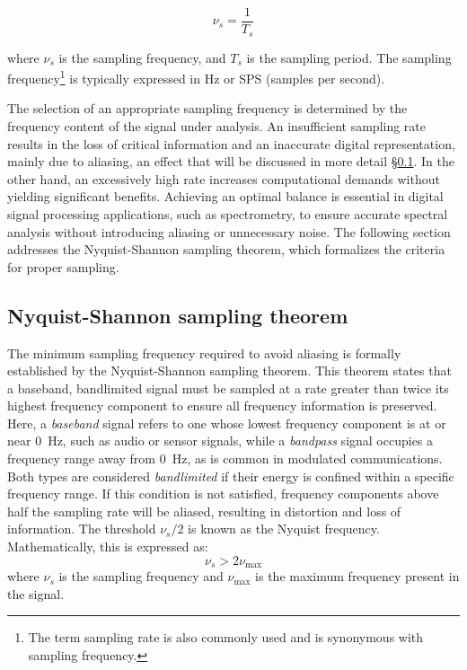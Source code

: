 \begin{equation}
	\nu_s = \frac{1}{T_s}
	\label{eq:sampling_frequency}
\end{equation}

where $\nu_s$ is the sampling frequency, and $T_s$ is the sampling period. The sampling frequency\footnote{The term sampling rate is also commonly used and is synonymous with sampling frequency.} is typically expressed in Hz or SPS (samples per second).


The selection of an appropriate sampling frequency is determined by the frequency content of the signal under analysis. An insufficient sampling rate results in the loss of critical information and an inaccurate digital representation, mainly due to aliasing, an effect that will be discussed in more detail \S \ref{sec:nyquist_shannon}. In the other hand, an excessively high rate increases computational demands without yielding significant benefits. Achieving an optimal balance is essential in digital signal processing applications, such as spectrometry, to ensure accurate spectral analysis without introducing aliasing or unnecessary noise. The following section addresses the Nyquist-Shannon sampling theorem, which formalizes the criteria for proper sampling.

\subsection{Nyquist-Shannon sampling theorem}
\label{sec:nyquist_shannon}
The minimum sampling frequency required to avoid aliasing is formally established by the Nyquist-Shannon sampling theorem. This theorem states that a baseband, bandlimited signal must be sampled at a rate greater than twice its highest frequency component to ensure all frequency information is preserved. Here, a \emph{baseband} signal refers to one whose lowest frequency component is at or near 0~Hz, such as audio or sensor signals, while a \emph{bandpass} signal occupies a frequency range away from 0~Hz, as is common in modulated communications. Both types are considered \emph{bandlimited} if their energy is confined within a specific frequency range. If this condition is not satisfied, frequency components above half the sampling rate will be aliased, resulting in distortion and loss of information. The threshold $\nu_s/2$ is known as the Nyquist frequency. Mathematically, this is expressed as:
\begin{equation}
	\nu_s > 2\nu_{\text{max}}
	\label{eq:nyquist_condition}
\end{equation}
where $\nu_s$ is the sampling frequency and $\nu_{\text{max}}$ is the maximum frequency present in the signal.


